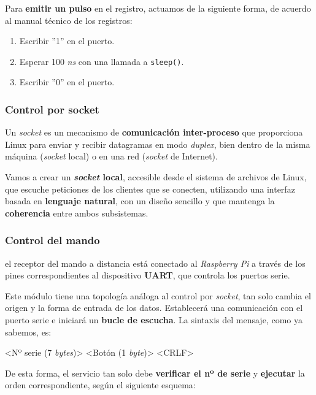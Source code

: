 \documentclass[10pt,a4paper]{article}
\begin{document}
	Para \textbf{emitir un pulso} en el registro, actuamos de la siguiente forma, de acuerdo al manual técnico de los registros:
	
	\begin{enumerate}
		\item Escribir ''1'' en el puerto.
		\item Esperar 100 \textit{ns} con una llamada a \verb|sleep()|.
		\item Escribir ''0'' en el puerto.
	\end{enumerate}
	
	\subsubsection*{Control por socket}
	
	Un \textit{socket} es un mecanismo de \textbf{comunicación inter-proceso} que proporciona Linux para enviar y recibir datagramas en modo \textit{duplex}, bien dentro de la misma máquina (\textit{socket} local) o en una red (\textit{socket} de Internet).
	
	Vamos a crear un \textbf{\textit{socket} local}, accesible desde el sistema de archivos de Linux, que escuche peticiones de los clientes que se conecten, utilizando una interfaz basada en \textbf{lenguaje natural}, con un diseño sencillo y que mantenga la \textbf{coherencia} entre ambos subsistemas.
	
	
	\subsubsection*{Control del mando}
	
	el receptor del mando a distancia está conectado al \textit{Raspberry Pi} a través de los pines correspondientes al dispositivo \textbf{UART}, que controla los puertos serie.
	
	Este módulo tiene una topología análoga al control por \textit{socket}, tan solo cambia el origen y la forma de entrada de los datos. Establecerá una comunicación con el puerto serie e iniciará un \textbf{bucle de escucha}. La sintaxis del mensaje, como ya sabemos, es:
	
	\begin{center}
		<Nº serie (7 \textit{bytes})> <Botón (1 \textit{byte})> <CRLF>
	\end{center}
	
	De esta forma, el servicio tan solo debe \textbf{verificar el nº de serie} y \textbf{ejecutar} la orden correspondiente, según el siguiente esquema:
	
\end{document}
